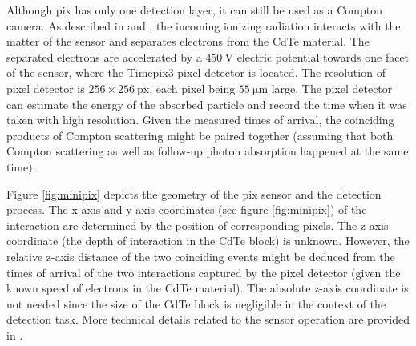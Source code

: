 Although \ac{pix} has only one detection layer, it can still be used as a Compton camera.
As described in \cite{baca2021gamma} and \cite{baca2019timepix}, the incoming ionizing radiation interacts with the matter of the sensor and separates electrons from the \ac{CdTe} material.
The separated electrons are accelerated by a $\SI{450}{\volt}$ electric potential towards one facet of the sensor, where the Timepix3 pixel detector is located.
The resolution of pixel detector is $256 \times 256\ \mathrm{px}$, each pixel being $55\ \si{\micro\meter}$ large.
The pixel detector can estimate the energy of the absorbed particle and record the time when it was taken with high resolution.
Given the measured times of arrival, the coinciding products of Compton scattering might be paired together (assuming that both Compton scattering as well as follow-up photon absorption happened at the same time).

Figure \ref{fig:minipix} depicts the geometry of the \ac{pix} sensor and the detection process.
The x-axis and y-axis coordinates (see figure \ref{fig:minipix}) of the interaction are determined by the position of corresponding pixels.
The z-axis coordinate (the depth of interaction in the \ac{CdTe} block) is unknown.
However, the relative z-axis distance of the two coinciding events might be deduced from the times of arrival of the two interactions captured by the pixel detector (given the known speed of electrons in the \ac{CdTe} material).
The absolute z-axis coordinate is not needed since the size of the \ac{CdTe} block is negligible in the context of the detection task.
More technical details related to the sensor operation are provided in \cite{baca2019timepix}.

